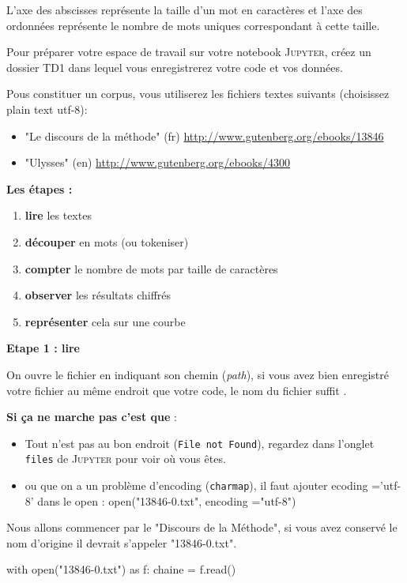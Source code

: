 L'axe des abscisses représente la taille d'un mot en caractères et
l'axe des ordonnées représente le nombre de mots uniques correspondant
à cette taille.

Pour préparer votre espace de travail sur votre notebook \textsc{Jupyter},
créez un dossier TD1 dans lequel vous enregistrerez votre code et
vos données.

Pous constituer un corpus, vous utiliserez les fichiers textes suivants
(choisissez plain text utf-8): 
\begin{itemize}
\item "Le discours de la méthode" (fr) \url{http://www.gutenberg.org/ebooks/13846}
\item "Ulysses" (en) \url{http://www.gutenberg.org/ebooks/4300} 
\end{itemize}
\newpage{}

\textbf{Les étapes :}
\begin{enumerate}
\item \textbf{lire} les textes 
\item \textbf{découper} en mots (ou tokeniser) 
\item \textbf{compter} le nombre de mots par taille de caractères 
\item \textbf{observer} les résultats chiffrés 
\item \textbf{représenter} cela sur une courbe 
\end{enumerate}
\textbf{Etape 1 : lire}

On ouvre le fichier en indiquant son chemin (\textit{path}), si vous
avez bien enregistré votre fichier au même endroit que votre code,
le nom du fichier suffit .

\textbf{Si ça ne marche pas c'est que} : 
\begin{itemize}
\item Tout n'est pas au bon endroit (\texttt{File not Found}), regardez
dans l'onglet \texttt{files} de \textsc{Jupyter} pour voir où vous
êtes. 
\item ou que on a un problème d'encoding (\texttt{charmap}), il faut ajouter
ecoding ='utf-8' dans le open : open("13846-0.txt", encoding ="utf-8") 
\end{itemize}
Nous allons commencer par le "Discours de la Méthode", si vous avez
conservé le nom d'origine il devrait s'appeler "13846-0.txt".

\begin{python} with open("13846-0.txt") as f: chaine = f.read()
\end{python}

